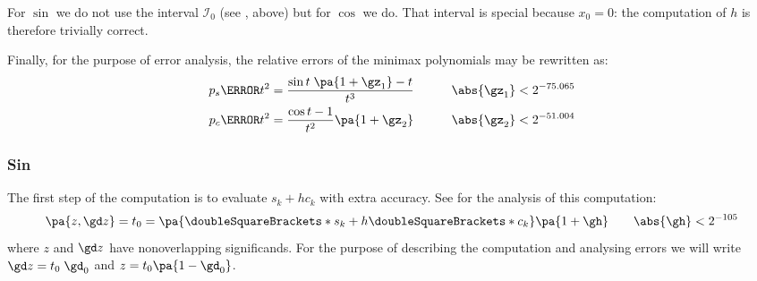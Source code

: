 \documentclass[10pt, a4paper, twoside]{basestyle}
\newcommand{\round}[1]{\doubleSquareBrackets*{#1}}
\begin{document}
For $\sin$ we do not use the interval $\mathscr{I}_0$ (see , above) but for $\cos$ we do.  That interval is special because $x_0 = 0$: the computation of $h$ is therefore trivially correct.

Finally, for the purpose of error analysis, the relative errors of the minimax polynomials may be rewritten as:
\begin{align*}
p_s\of{t^2} &= \frac{\sin t \; \pa{1 + \gz_1} - t}{t^3} \qquad & \abs{\gz_1} < 2^{-75.065} \\
p_c\of{t^2} &= \frac{\cos t - 1}{t^2} \pa{1 + \gz_2} \qquad & \abs{\gz_2} < 2^{-51.004}
\end{align*}

\subsubsection*{Sin}\label{secerroranalysissin}

The first step of the computation is to evaluate $s_k + h c_k$ with extra accuracy.  See  for the analysis of this computation:
\[
\pa{z, \gd z} = t_0 = \pa{\round{s_k} + h \round{c_k}} \pa{1 + \gh} \qquad \abs{\gh} < 2^{-105}
\]
where $z$ and $\gd z$ have nonoverlapping significands.  For the purpose of describing the computation and analysing errors we will write $\gd z = t_0 \; \gd_0$ and $z = t_0 \pa{1 - \gd_0}$.
\end{document}
